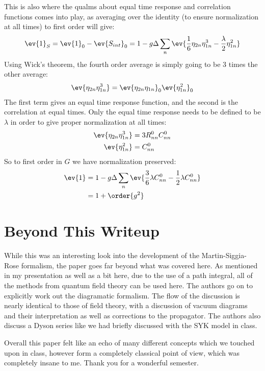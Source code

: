\documentclass[12pt]{article}
\begin{document}
This is also where the qualms about equal time response and correlation functions comes into play, as averaging over the identity (to ensure normalization at all times) to first order will give:
\begin{align*}
  \ev{1}_S=\ev{1}_0-\ev{S_{int}}_0=
  1-g\Delta\sum_n\ev{\frac16\eta_{2n}\eta^3_{1n}-\frac\lambda2\eta_{1n}^2}
\end{align*}
Using Wick's theorem, the fourth order average is simply going to be 3 times the other average:
\begin{align*}
  \ev{\eta_{2n}\eta_{1n}^3}=\ev{\eta_{2n}\eta_{1n}}_0\ev{\eta_{1n}^2}_0
\end{align*}
The first term gives an equal time response function, and the second is the correlation at equal times. Only the equal time response needs to be defined to be $\lambda$ in order to give proper normalization at all times:
\begin{align*}
  \ev{\eta_{2n}\eta_{1n}^3}&=3R_{nn}^0C_{nn}^0\\
  \ev{\eta_{1n}^2}&=C_{nn}^0
\end{align*}
So to first order in $G$ we have normalization preserved:
\begin{align*}
  \ev{1}&=1-g\Delta\sum_n\ev{\frac36\lambda C_{nn}^0-\frac12\lambda C_{nn}^0}\\
  &=1+\order{g^2}
\end{align*}

\section{Beyond This Writeup}
While this was an interesting look into the development of the Martin-Siggia-Rose formalism, the paper goes far beyond what was covered here. As mentioned in my presentation as well as a bit here, due to the use of a path integral, all of the methods from quantum field theory can be used here. The authors go on to explicitly work out the diagramatic formalism. The flow of the discussion is nearly identical to those of field theory, with a discussion of vacuum diagrams and their interpretation as well as corrections to the propagator. The authors also discuss a Dyson series like we had briefly discussed with the SYK model in class.

Overall this paper felt like an echo of many different concepts which we touched upon in class, however form a completely classical point of view, which was completely insane to me. Thank you for a wonderful semester. 



\end{document}
